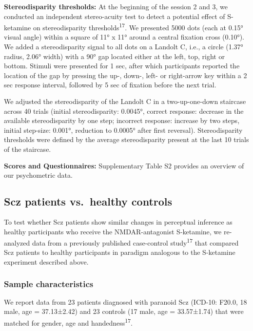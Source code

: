 \documentclass[
]{article}
\begin{document}
\textbf{Stereodisparity thresholds:} At the beginning of the session 2
and 3, we conducted an independent stereo-acuity test to detect a
potential effect of S-ketamine on stereodisparity
thresholds\textsuperscript{17}. We presented 5000 dots (each at 0.15°
visual angle) within a square of 11° x 11° around a central fixation
cross (0.10°). We added a stereodisparity signal to all dots on a
Landolt C, i.e., a circle (1.37° radius, 2.06° width) with a 90° gap
located either at the left, top, right or bottom. Stimuli were presented
for 1 sec, after which participants reported the location of the gap by
pressing the up-, down-, left- or right-arrow key within a 2 sec
response interval, followed by 5 sec of fixation before the next trial.

We adjusted the stereodisparity of the Landolt C in a two-up-one-down
staircase across 40 trials (initial stereodisparity: 0.0045°, correct
response: decrease in the available stereodisparity by one step;
incorrect response: increase by two steps, initial step-size: 0.001°,
reduction to 0.0005° after first reversal). Stereodisparity thresholds
were defined by the average stereodisparity present at the last 10
trials of the staircase.

\textbf{Scores and Questionnaires:} Supplementary Table S2 provides an
overview of our psychometric data.

\subsection{Scz patients vs.~healthy
controls}\label{scz-patients-vs.-healthy-controls}

To test whether Scz patients show similar changes in perceptual
inference as healthy participants who receive the NMDAR-antagonist
S-ketamine, we re-analyzed data from a previously published case-control
study\textsuperscript{17} that compared Scz patients to healthy
participants in paradigm analogous to the S-ketamine experiment
described above.

\subsubsection{Sample characteristics}\label{sample-characteristics-1}

We report data from 23 patients diagnosed with paranoid Scz (ICD-10:
F20.0, 18 male, age = 37.13±2.42) and 23 controls (17 male, age =
33.57±1.74) that were matched for gender, age and
handedness\textsuperscript{17}.
\end{document}
